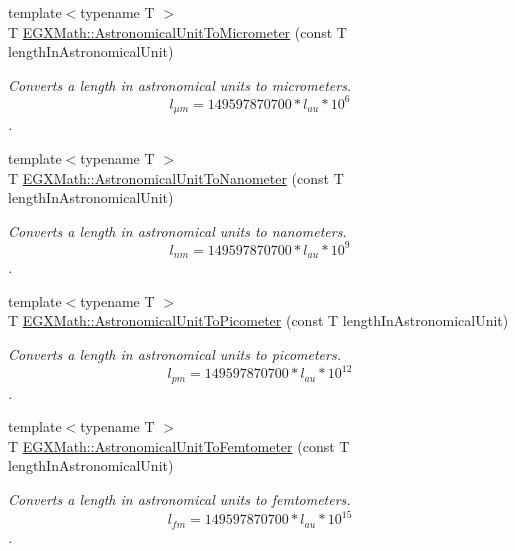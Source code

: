 \begin{DoxyCompactItemize}
{\footnotesize template$<$typename T $>$ }\\T \mbox{\hyperlink{group___e_g_x_math-_conversions-_length_conversions-_astronomical-_astronomical_unit-_s_i_ga23b887b2e141dc9686237c124e2245ac}{E\+G\+X\+Math\+::\+Astronomical\+Unit\+To\+Micrometer}} (const T length\+In\+Astronomical\+Unit)
\begin{DoxyCompactList}\small\item\em Converts a length in astronomical units to micrometers. \[ l_{\mu m}=149597870700 * l_{au} * 10^{6} \]. \end{DoxyCompactList}\item 
{\footnotesize template$<$typename T $>$ }\\T \mbox{\hyperlink{group___e_g_x_math-_conversions-_length_conversions-_astronomical-_astronomical_unit-_s_i_ga96544de7ba57c47bcdf515f2603d0460}{E\+G\+X\+Math\+::\+Astronomical\+Unit\+To\+Nanometer}} (const T length\+In\+Astronomical\+Unit)
\begin{DoxyCompactList}\small\item\em Converts a length in astronomical units to nanometers. \[ l_{nm}=149597870700 * l_{au} * 10^{9} \]. \end{DoxyCompactList}\item 
{\footnotesize template$<$typename T $>$ }\\T \mbox{\hyperlink{group___e_g_x_math-_conversions-_length_conversions-_astronomical-_astronomical_unit-_s_i_gaf512b8f1ace4be83fbeb252b447405d6}{E\+G\+X\+Math\+::\+Astronomical\+Unit\+To\+Picometer}} (const T length\+In\+Astronomical\+Unit)
\begin{DoxyCompactList}\small\item\em Converts a length in astronomical units to picometers. \[ l_{pm}=149597870700 * l_{au} * 10^{12} \]. \end{DoxyCompactList}\item 
{\footnotesize template$<$typename T $>$ }\\T \mbox{\hyperlink{group___e_g_x_math-_conversions-_length_conversions-_astronomical-_astronomical_unit-_s_i_gaa39df97fbf96f7e68369e60f34351234}{E\+G\+X\+Math\+::\+Astronomical\+Unit\+To\+Femtometer}} (const T length\+In\+Astronomical\+Unit)
\begin{DoxyCompactList}\small\item\em Converts a length in astronomical units to femtometers. \[ l_{fm}=149597870700 * l_{au} * 10^{15} \]. \end{DoxyCompactList}\item 

\end{DoxyCompactItemize}
